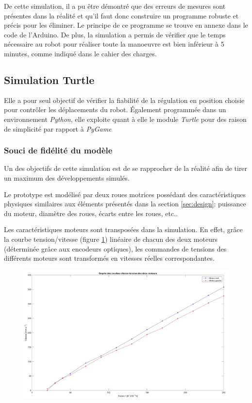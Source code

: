 \documentclass[a4paper,11pt]{article}
\begin{document}
De cette simulation, il a pu être démontré que des erreurs de mesures sont présentes dans la réalité et qu'il faut donc construire un programme robuste et précis pour les éliminer. Le principe de ce programme se trouve en annexe dans le code de l'Arduino. De plus, la simulation a permis de vérifier que le temps nécessaire au robot pour réaliser toute la manoeuvre est bien inférieur à 5 minutes, comme indiqué dans le cahier des charges.

\subsection{\label{subsec:simuT}Simulation Turtle}

Elle a pour seul objectif de vérifier la fiabilité de la régulation en position choisie pour contrôler les déplacements du robot. Également programmée dans un environnement \textit{Python}, elle exploite quant à elle le module \textit{Turtle} pour des raison de simplicité par rapport à \textit{PyGame}

\subsubsection{Souci de fidélité du modèle}

Un des objectifs de cette simulation est de se rapprocher de la réalité afin de tirer un maximum des développements simulés.

Le prototype est modélisé par deux roues motrices possédant des caractéristiques physiques similaires aux éléments présentés dans la section \ref{sec:design}: puissance du moteur, diamètre des roues, écarts entre les roues, etc..

Les caractéristiques moteurs sont transposées dans la simulation. En effet, grâce la courbe tension/vitesse (figure \ref{courbe_UV}) linéaire de chacun des deux moteurs (déterminée grâce aux encodeurs optiques), les commandes de tensions des différents moteurs sont transformés en vitesses réelles correspondantes.

\begin{figure}[H]
    \centering
    \includegraphics[scale = 0.21]{courbeUV.jpg}
    \label{courbe_UV}
\end{figure}
\end{document}
